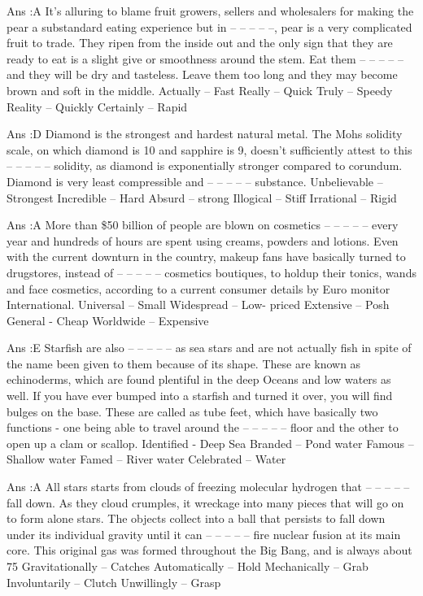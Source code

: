     Ans :A
    It’s alluring to blame fruit growers, sellers and wholesalers for making the pear a substandard eating experience but in -- -- -- -- --, pear is a very complicated fruit to trade. They ripen from the inside out and the only sign that they are ready to eat is a slight give or smoothness around the stem. Eat them -- -- -- -- -- and they will be dry and tasteless. Leave them too long and they may become brown and soft in the middle.
        Actually – Fast
        Really – Quick
        Truly – Speedy
        Reality – Quickly
        Certainly – Rapid 

    Ans :D
    Diamond is the strongest and hardest natural metal. The Mohs solidity scale, on which diamond is 10 and sapphire is 9, doesn't sufficiently attest to this -- -- -- -- -- solidity, as diamond is exponentially stronger compared to corundum. Diamond is very least compressible and -- -- -- -- -- substance.
        Unbelievable – Strongest
        Incredible – Hard
        Absurd – strong
        Illogical – Stiff
        Irrational – Rigid 

    Ans :A
    More than \$50 billion of people are blown on cosmetics -- -- -- -- -- every year and hundreds of hours are spent using creams, powders and lotions. Even with the current downturn in the country, makeup fans have basically turned to drugstores, instead of -- -- -- -- -- cosmetics boutiques, to holdup their tonics, wands and face cosmetics, according to a current consumer details by Euro monitor International.
        Universal – Small
        Widespread – Low- priced
        Extensive – Posh
        General - Cheap
        Worldwide – Expensive 

    Ans :E
    Starfish are also -- -- -- -- -- as sea stars and are not actually fish in spite of the name been given to them because of its shape. These are known as echinoderms, which are found plentiful in the deep Oceans and low waters as well. If you have ever bumped into a starfish and turned it over, you will find bulges on the base. These are called as tube feet, which have basically two functions - one being able to travel around the -- -- -- -- -- floor and the other to open up a clam or scallop.
        Identified - Deep Sea
        Branded – Pond water
        Famous – Shallow water
        Famed – River water
        Celebrated – Water 

    Ans :A
    All stars starts from clouds of freezing molecular hydrogen that -- -- -- -- -- fall down. As they cloud crumples, it wreckage into many pieces that will go on to form alone stars. The objects collect into a ball that persists to fall down under its individual gravity until it can -- -- -- -- -- fire nuclear fusion at its main core. This original gas was formed throughout the Big Bang, and is always about 75%
        Gravitationally – Catches
        Automatically – Hold
        Mechanically – Grab
        Involuntarily – Clutch
        Unwillingly – Grasp 

